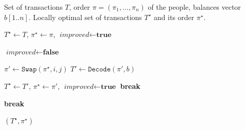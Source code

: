 \begin{algorithmic}[1]
    \INPUT  Set of transactions $T$, order $\pi = (\pi_1, \dots, \pi_n)$ of the people, balances vector $b[1..n]$.
    \OUTPUT Locally optimal set of transactions $T^\star$ and its order $\pi^\star$.

    \State $T^\star \leftarrow T$, $\pi^\star \leftarrow \pi$, $\textit{improved} \leftarrow \textbf{true}$

        \State $\textit{improved} \leftarrow \textbf{false}$

                \State $\pi' \leftarrow \texttt{Swap}(\pi^\star, i, j)$
                \State $T' \leftarrow \texttt{Decode}(\pi', b)$

                    \State $T^\star \leftarrow T'$, $\pi^\star \leftarrow \pi'$, $\textit{improved} \leftarrow \textbf{true}$
                    \State \textbf{break}
                \EndIf
            \EndFor

                \State \textbf{break}
            \EndIf
        \EndFor
    \EndWhile

    \State \Return $(T^\star, \pi^\star)$

\end{algorithmic}